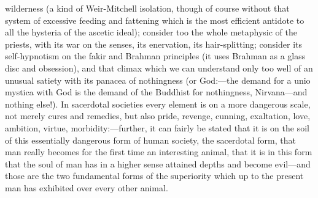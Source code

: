 \documentclass[12pt]{article}
\begin{document}
wilderness (a kind of Weir-Mitchell isolation, though of course without that system of excessive feeding and fattening which is the most efficient antidote to all the hysteria of the ascetic ideal); consider too the whole metaphysic of the priests, with its war on the senses, its enervation, its hair-splitting; consider its self-hypnotism on the fakir and Brahman principles (it uses Brahman as a glass disc and obsession), and that climax which we can understand only too well of an unusual satiety with its panacea of nothingness (or God:---the demand for a unio mystica with God is the demand of the Buddhist for nothingness, Nirvana---and nothing else!). In sacerdotal societies every element is on a more dangerous scale, not merely cures and remedies, but also pride, revenge, cunning, exaltation, love, ambition, virtue, morbidity:---further, it can fairly be stated that it is on the soil of this essentially dangerous form of human society, the sacerdotal form, that man really becomes for the first time an interesting animal, that it is in this form that the soul of man has in a higher sense attained depths and become evil---and those are the two fundamental forms of the superiority which up to the present man has exhibited over every other animal.
\end{document}
